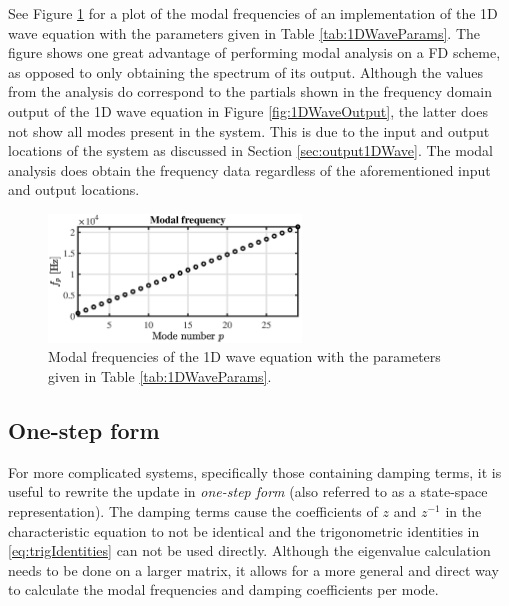 {{{{See Figure \ref{fig:modalFreqs1Dwave} for a plot of the modal frequencies of an implementation of the 1D wave equation with the parameters given in Table \ref{tab:1DWaveParams}.
The figure shows one great advantage of performing modal analysis on a FD scheme, as opposed to only obtaining the spectrum of its output. Although the values from the analysis do correspond to the partials shown in the frequency domain output of the 1D wave equation in Figure \ref{fig:1DWaveOutput}, the latter does not show all modes present in the system. This is due to the input and output locations of the system as discussed in Section \ref{sec:output1DWave}. The modal analysis does obtain the frequency data regardless of the aforementioned input and output locations. 

\begin{figure}[h]
    \centering
    \includegraphics[width = 0.6\textwidth]{figures/analysis/1dmodes.eps}
    \caption{Modal frequencies of the 1D wave equation with the parameters given in Table \ref{tab:1DWaveParams}. \label{fig:modalFreqs1Dwave}}
\end{figure}

\subsection{One-step form}\label{sec:oneStepForm}
For more complicated systems, specifically those containing damping terms, it is useful to rewrite the update in \textit{one-step form} (also referred to as a state-space representation). The damping terms cause the coefficients of $z$ and $z^{-1}$ in the characteristic equation to not be identical and the trigonometric identities in \eqref{eq:trigIdentities} can not be used directly. Although the eigenvalue calculation needs to be done on a larger matrix, it allows for a more general and direct way to calculate the modal frequencies and damping coefficients per mode. 

}}}}
